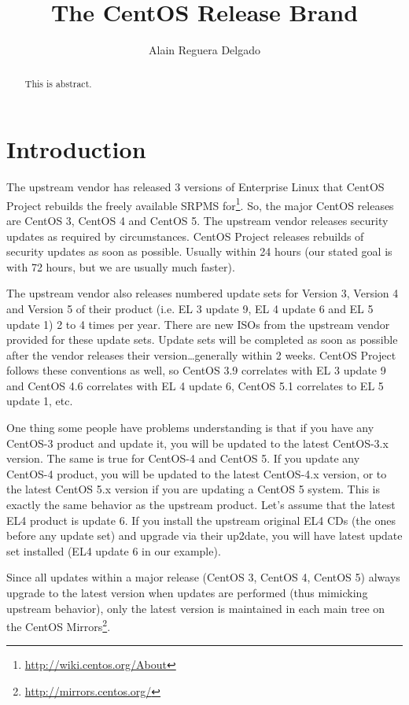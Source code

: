 \documentclass{article}
\title{The CentOS Release Brand}
\author{Alain Reguera Delgado}
\begin{document}
\maketitle

\begin{abstract}
This is abstract.
\end{abstract}

\tableofcontents

\section{Introduction}

The upstream vendor has released 3 versions of Enterprise Linux that
CentOS Project rebuilds the freely available SRPMS for\footnote{
\url{http://wiki.centos.org/About}}. So, the major CentOS releases are
CentOS 3, CentOS 4 and CentOS 5. The upstream vendor releases security
updates as required by circumstances. CentOS Project releases rebuilds
of security updates as soon as possible. Usually within 24 hours (our
stated goal is with 72 hours, but we are usually much faster).

The upstream vendor also releases numbered update sets for Version 3,
Version 4 and Version 5 of their product (i.e. EL 3 update 9, EL 4
update 6 and EL 5 update 1) 2 to 4 times per year. There are new ISOs
from the upstream vendor provided for these update sets. Update sets
will be completed as soon as possible after the vendor releases their
version\ldots generally within 2 weeks. CentOS Project follows these
conventions as well, so CentOS 3.9 correlates with EL 3 update 9 and
CentOS 4.6 correlates with EL 4 update 6, CentOS 5.1 correlates to EL
5 update 1, etc.

One thing some people have problems understanding is that if you have
any CentOS-3 product and update it, you will be updated to the latest
CentOS-3.x version. The same is true for CentOS-4 and CentOS 5. If you
update any CentOS-4 product, you will be updated to the latest
CentOS-4.x version, or to the latest CentOS 5.x version if you are
updating a CentOS 5 system.  This is exactly the same behavior as the
upstream product. Let's assume that the latest EL4 product is update
6. If you install the upstream original EL4 CDs (the ones before any
update set) and upgrade via their up2date, you will have latest update
set installed (EL4 update 6 in our example). 

Since all updates within a major release (CentOS 3, CentOS 4, CentOS
5) always upgrade to the latest version when updates are performed
(thus mimicking upstream behavior), only the latest version is
maintained in each main tree on the CentOS
Mirrors\footnote{\url{http://mirrors.centos.org/}}.
\end{document}
